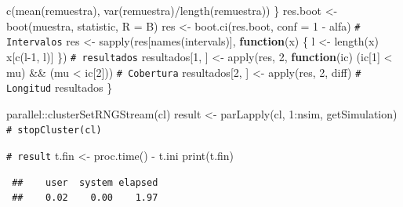 \documentclass[
]{book}
\newenvironment{Shaded}{\begin{snugshade}}{\end{snugshade}}
\newcommand{\AttributeTok}[1]{\textcolor[rgb]{0.77,0.63,0.00}{#1}}
\newcommand{\CommentTok}[1]{\textcolor[rgb]{0.56,0.35,0.01}{\textit{#1}}}
\newcommand{\ControlFlowTok}[1]{\textcolor[rgb]{0.13,0.29,0.53}{\textbf{#1}}}
\newcommand{\DecValTok}[1]{\textcolor[rgb]{0.00,0.00,0.81}{#1}}
\newcommand{\FunctionTok}[1]{\textcolor[rgb]{0.00,0.00,0.00}{#1}}
\newcommand{\NormalTok}[1]{#1}
\newcommand{\OtherTok}[1]{\textcolor[rgb]{0.56,0.35,0.01}{#1}}
\newcommand{\SpecialCharTok}[1]{\textcolor[rgb]{0.00,0.00,0.00}{#1}}
\theoremstyle{break}
\theoremstyle{nonumberplain}
\renewcommand{\CommentTok}[1]{\textcolor[rgb]{0.41,0.41,0.41}{\texttt{#1}}}
\begin{document}
\begin{Shaded}
\begin{Highlighting}[]
      \FunctionTok{c}\NormalTok{(}\FunctionTok{mean}\NormalTok{(remuestra), }\FunctionTok{var}\NormalTok{(remuestra)}\SpecialCharTok{/}\FunctionTok{length}\NormalTok{(remuestra))}
\NormalTok{    \}}
\NormalTok{    res.boot }\OtherTok{\textless{}{-}} \FunctionTok{boot}\NormalTok{(muestra, statistic, }\AttributeTok{R =}\NormalTok{ B)}
\NormalTok{    res }\OtherTok{\textless{}{-}} \FunctionTok{boot.ci}\NormalTok{(res.boot, }\AttributeTok{conf =} \DecValTok{1} \SpecialCharTok{{-}}\NormalTok{ alfa)}
    \CommentTok{\# Intervalos}
\NormalTok{    res }\OtherTok{\textless{}{-}} \FunctionTok{sapply}\NormalTok{(res[}\FunctionTok{names}\NormalTok{(intervals)], }\ControlFlowTok{function}\NormalTok{(x) \{}
\NormalTok{      l }\OtherTok{\textless{}{-}} \FunctionTok{length}\NormalTok{(x)}
\NormalTok{      x[}\FunctionTok{c}\NormalTok{(l}\DecValTok{{-}1}\NormalTok{, l)]}
\NormalTok{    \})}
    \CommentTok{\# resultados}
\NormalTok{    resultados[}\DecValTok{1}\NormalTok{, ] }\OtherTok{\textless{}{-}} \FunctionTok{apply}\NormalTok{(res, }\DecValTok{2}\NormalTok{,}
                                   \ControlFlowTok{function}\NormalTok{(ic) (ic[}\DecValTok{1}\NormalTok{] }\SpecialCharTok{\textless{}}\NormalTok{ mu) }\SpecialCharTok{\&\&}\NormalTok{ (mu }\SpecialCharTok{\textless{}}\NormalTok{ ic[}\DecValTok{2}\NormalTok{])) }\CommentTok{\# Cobertura}
\NormalTok{    resultados[}\DecValTok{2}\NormalTok{, ] }\OtherTok{\textless{}{-}} \FunctionTok{apply}\NormalTok{(res, }\DecValTok{2}\NormalTok{, diff) }\CommentTok{\# Longitud}
\NormalTok{    resultados}
\NormalTok{\}}

\NormalTok{parallel}\SpecialCharTok{::}\FunctionTok{clusterSetRNGStream}\NormalTok{(cl)}
\NormalTok{result }\OtherTok{\textless{}{-}} \FunctionTok{parLapply}\NormalTok{(cl, }\DecValTok{1}\SpecialCharTok{:}\NormalTok{nsim, getSimulation)}
\CommentTok{\# stopCluster(cl)}

\CommentTok{\# result}
\NormalTok{t.fin }\OtherTok{\textless{}{-}} \FunctionTok{proc.time}\NormalTok{() }\SpecialCharTok{{-}}\NormalTok{ t.ini}
\FunctionTok{print}\NormalTok{(t.fin)}
\end{Highlighting}
\end{Shaded}

\begin{verbatim}
 ##    user  system elapsed 
 ##    0.02    0.00    1.97
\end{verbatim}
\end{document}
